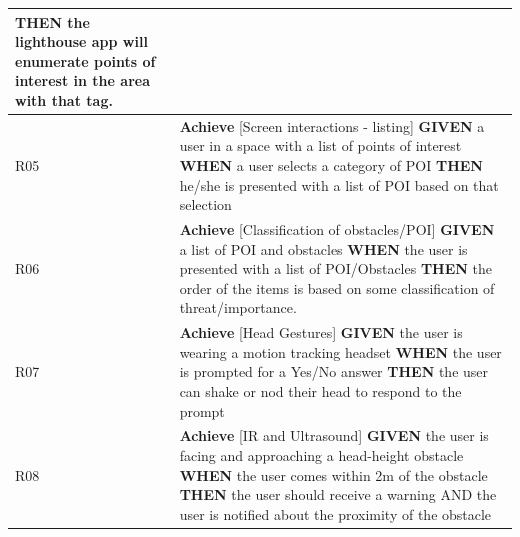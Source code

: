 \documentclass[prodmode,acmtosem]{acmsmall} %
\begin{document}
\begin{center}
\begin{tabularx}{\textwidth}{| p{1.5em} | X |}
		\textbf{THEN} the lighthouse app will enumerate points of interest in the area with that tag. \\ 
 \hline
 R05 & 
 		\textbf{Achieve} [Screen interactions - listing]\newline\newline
 		\textbf{GIVEN} a user in a space with a list of points of interest\newline
		\textbf{WHEN} a user selects a category of POI\newline
		\textbf{THEN} he/she is presented with a list of POI based on that selection \\ 
 \hline
 R06 & 
 		\textbf{Achieve} [Classification of obstacles/POI]\newline\newline
 		\textbf{GIVEN} a list of POI and obstacles\newline
		\textbf{WHEN} the user is presented with a list of POI/Obstacles\newline
		\textbf{THEN} the order of the items is based on some classification of threat/importance. \\ 
 \hline
 R07 & 
 		\textbf{Achieve} [Head Gestures]\newline\newline
 		\textbf{GIVEN} the user is wearing a motion tracking headset\newline
		\textbf{WHEN} the user is prompted for a Yes/No answer\newline
		\textbf{THEN} the user can shake or nod their head to respond to the prompt \\  
 \hline
 R08 & 
 		\textbf{Achieve} [IR and Ultrasound]\newline\newline
 		\textbf{GIVEN} the user is facing and approaching a head-height obstacle\newline
		\textbf{WHEN} the user comes within 2m of the obstacle\newline
		\textbf{THEN} the user should receive a warning\newline
		AND the user is notified about the proximity of the obstacle \\  
 \hline

 \hline
\end{tabularx}
\label{tab:requirements}
\end{center}
\end{document}
